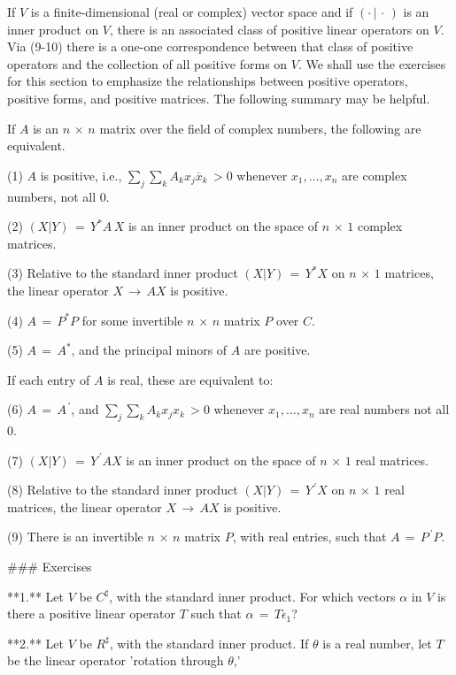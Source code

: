If \(V\) is a finite-dimensional (real or complex) vector space and if \((\cdot\,|\,\cdot\,)\) is an inner product on \(V\), there is an associated class of positive linear operators on \(V\). Via (9-10) there is a one-one correspondence between that class of positive operators and the collection of all positive forms on \(V\). We shall use the exercises for this section to emphasize the relationships between positive operators, positive forms, and positive matrices. The following summary may be helpful.

If \(A\) is an \(n\,\times\,n\) matrix over the field of complex numbers, the following are equivalent.

(1) \(A\) is positive, i.e., \(\sum\limits_{j}\sum\limits_{k}A_{k}x_{j}\overline{x}_{k}\,>0\) whenever \(x_{1},\ldots,x_{n}\) are complex numbers, not all 0.

(2) \((X|Y)\,=\,Y^{*}A\,X\) is an inner product on the space of \(n\,\times\,1\) complex matrices.

(3) Relative to the standard inner product \((X|Y)\,=\,Y^{*}X\) on \(n\,\times\,1\) matrices, the linear operator \(X\,\xrightarrow{}\,AX\) is positive.

(4) \(A\,=\,P^{*}P\) for some invertible \(n\,\times\,n\) matrix \(P\) over \(C\).

(5) \(A\,=\,A^{*}\), and the principal minors of \(A\) are positive.

If each entry of \(A\) is real, these are equivalent to:

(6) \(A\,=\,A^{\,\prime}\), and \(\sum\limits_{j}\sum\limits_{k}A_{k}x_{j}x_{k}\,>0\) whenever \(x_{1},\ldots,x_{n}\) are real numbers not all 0.

(7) \((X|Y)\,=\,Y^{\,\prime}AX\) is an inner product on the space of \(n\,\times\,1\) real matrices.

(8) Relative to the standard inner product \((X|Y)\,=\,Y^{\,\prime}X\) on \(n\,\times\,1\) real matrices, the linear operator \(X\,\xrightarrow{}\,AX\) is positive.

(9) There is an invertible \(n\,\times\,n\) matrix \(P\), with real entries, such that \(A\,=\,P^{\,\prime}P\).

### Exercises

**1.** Let \(V\) be \(C^{\sharp}\), with the standard inner product. For which vectors \(\alpha\) in \(V\) is there a positive linear operator \(T\) such that \(\alpha\,=\,T\epsilon_{1}\)?

**2.** Let \(V\) be \(R^{\sharp}\), with the standard inner product. If \(\theta\) is a real number, let \(T\) be the linear operator 'rotation through \(\theta\),'

